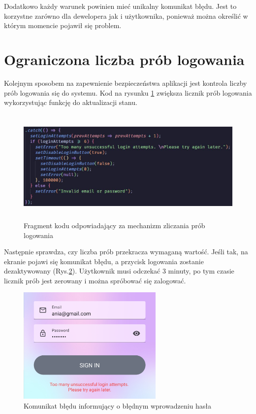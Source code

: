 Dodatkowo każdy warunek powinien mieć unikalny komunikat błędu. Jest to korzystne zarówno dla dewelopera jak i użytkownika, ponieważ można określić w którym momencie pojawił się problem.


\section*{Ograniczona liczba prób logowania}
Kolejnym sposobem na zapewnienie bezpieczeństwa aplikacji jest kontrola liczby prób logowania się do systemu. Kod na rysunku \ref{fig:LiczbaProb} zwiększa licznik prób logowania wykorzystując funkcję do aktualizacji stanu.

\begin{figure}[ht]
	\centering
	\includegraphics[height=5.6cm]{images/bezpieczenstwo/liczba_prob_kod}
	\caption{Fragment kodu odpowiadający za mechanizm zliczania prób logowania}
	\label{fig:LiczbaProb}
\end{figure}

 Następnie sprawdza, czy liczba prób przekracza wymaganą wartość. Jeśli tak, na ekranie pojawi się komunikat błędu, a przycisk logowania zostanie dezaktywowany (Rys.\ref{fig:Blad}). Użytkownik musi odczekać 3 minuty, po tym czasie licznik prób jest zerowany i można spróbować się zalogować.
\begin{figure}[H]
	\centering
	\vspace{0.25cm}
	\includegraphics[height=5.7cm]{images/bezpieczenstwo/blad}
	\caption{Komunikat błędu informujący o błędnym wprowadzeniu hasła}
	\label{fig:Blad}
\end{figure}


